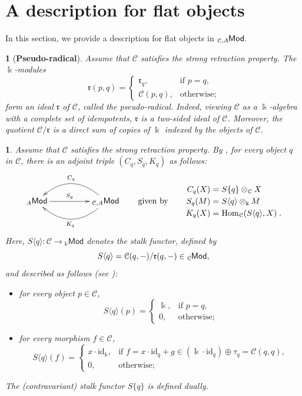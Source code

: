 \documentclass{amsart}
\theoremstyle{bfupright head,slanted body}
\theoremstyle{bfupright head,upright body}
\newtheorem{bfhpg}[res]{}               \newtheorem*{bfhpg*}{}
\theoremstyle{fixed bf head,slanted body}
\theoremstyle{fixed bf head,upright body}
\theoremstyle{numbered paragraph}
\newtheorem{ipg}[res]{}
\numberwithin{equation}{res}
\newcommand{\Mod}[1]{{_{#1}\mathsf{Mod}}}
\newcommand{\Hom}[3][]{\operatorname{Hom}_{#1}(#2,#3)}
\newcommand{\C}{\mathcal{C}}
\newcommand{\id}{\mathrm{id}}
\newcommand{\kk}{\Bbbk}
\newcommand{\lMod}[1]{{}_{#1}\mspace{-1mu}{\sf{Mod}}}
\begin{document}
\section{A description for flat objects}
\noindent In this section, we provide a description for flat objects in $\lMod{\C,A}$.

\begin{bfhpg}[\bf Pseudo-radical]\label{radical}
Assume that $\C$ satisfies the strong retraction property. The $\Bbbk$-modules
\[
\mathfrak{r}(p,q)=
\begin{cases}
\mathfrak{r}_q, & \text{if } p=q,\\
\C(p,q), & \text{otherwise};
\end{cases}
\]
form an ideal $\mathfrak{r}$ of $\C$, called the \emph{pseudo-radical}. Indeed, viewing $\C$ as a $\kk$-algebra with a complete set of idempotents, $\mathfrak{r}$ is a two-sided ideal of $\C$. Moreover, the quotient $\C/\mathfrak{r}$ is a direct sum of copies of $\kk$ indexed by the objects of $\C$.
\end{bfhpg}

\begin{ipg}\label{adjoint triple2}
Assume that $\C$ satisfies the strong retraction property. By \cite[Proposition 7.15]{HJ21}, for every object $q$ in $\C$, there is an adjoint triple $(C_{q},S_{q},K_{q})$ as follows:
  \begin{equation*}
  \xymatrix@C=4pc{
    \Mod{A}
    \ar[r]^-{S_{q}}
    &
    \Mod{\C,A}
    \ar@/_1.8pc/[l]_-{C_{q}}
    \ar@/^1.8pc/[l]^-{K_{q}}
  }
  \qquad \text{given by} \qquad
  {\setlength\arraycolsep{1.5pt}
   \renewcommand{\arraystretch}{1.2}
  \begin{array}{rcl}
  C_q(X) &=& S\{q\} \otimes_\C X \\
  S_q(M) &=& S\langle q\rangle\otimes_\kk M \\
  K_{q}(X) &=& \Hom[\C]{S\langle q\rangle}{X}\;.
  \end{array}
  }
  \end{equation*}
Here, $S\langle q\rangle: \C\to \Mod{\kk}$ denotes the \emph{stalk functor},
defined by
\[
S\langle q\rangle=\C(q,-)/\mathfrak{r}(q,-)\in\lMod{\C},
\]
and described as follows (see \cite[Lemma 7.10]{HJ21}):
\begin{itemize}
\item for every object $p\in\C$,
\[
S\langle q\rangle(p)=
\begin{cases}
\kk, & \text{if } p=q,\\
0, & \text{otherwise};
\end{cases}
\]
\item for every morphism $f\in\C$,
\[
S\langle q\rangle(f) =
\begin{cases}
x\cdot \id_\kk, & \text{if } f=x\cdot\id_q+g\in(\kk\cdot\id_q)\oplus\tau_q=\C(q,q),\\
0, & \text{otherwise};
\end{cases}
\]
\end{itemize}
The (contravariant) stalk functor $S\{q\}$ is defined dually.
\end{ipg}
\end{document}
